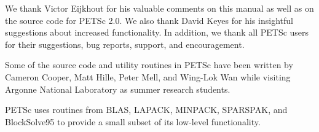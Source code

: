 

\medskip \medskip 
We thank Victor Eijkhout for his valuable comments on this
manual as well as on the source code for PETSc 2.0.  We also thank David
Keyes for his insightful suggestions about increased functionality.
In addition, we thank all PETSc users for
their suggestions, bug reports, support, and encouragement.

\vspace{.3in}
Some of the source code and utility routines in PETSc have been
written by Cameron Cooper, Matt Hille, Peter Mell, and Wing-Lok Wan
while visiting Argonne National Laboratory as summer research
students.

\vspace{.3in}
PETSc uses routines from BLAS, LAPACK, MINPACK, SPARSPAK, and BlockSolve95 to
provide a small subset of its low-level functionality.
